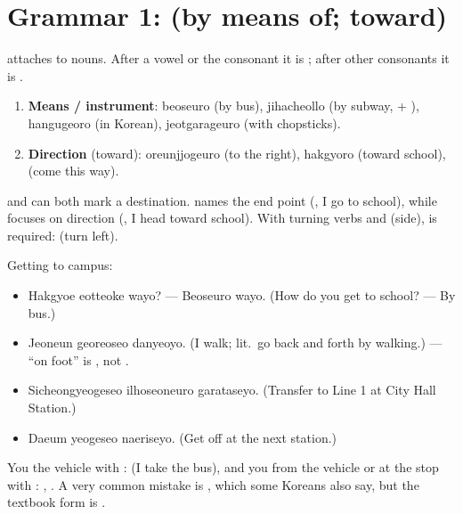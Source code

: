 \section{Grammar 1:  (by means of; toward)}

 attaches to nouns. After a vowel or the consonant  it is ;
after other consonants it is .

\begin{enumerate}
  \item \textbf{Means / instrument}:  beoseuro (by bus), 
        jihacheollo (by subway,  + ),  hangugeoro (in Korean),
         jeotgarageuro (with chopsticks).
  \item \textbf{Direction} (toward):  oreunjjogeuro (to the right),
         hakgyoro (toward school),  (come this way).
\end{enumerate}

\begin{remark}
 and  can both mark a destination.  names the end point
(, I go to school), while  focuses on direction (, I head toward school). With turning verbs and  (side),  is
required:  (turn left).
\end{remark}

\begin{example}
Getting to campus:
\begin{itemize}
  \item {} Hakgyoe eotteoke wayo? --- Beoseuro
        wayo. (How do you get to school? --- By bus.)
  \item {} Jeoneun georeoseo danyeoyo. (I walk; lit.\ go back and
        forth by walking.) --- ``on foot'' is , not .
  \item {} Sicheongyeogeseo ilhoseoneuro garataseyo.
        (Transfer to Line 1 at City Hall Station.)
  \item {} Daeum yeogeseo naeriseyo. (Get off at the next
        station.)
\end{itemize}
\end{example}

\begin{important}
You  the vehicle with :  (I take the bus), and you
 from the vehicle or at the stop with : ,
. A very common mistake is , which some Koreans
also say, but the textbook form is .
\end{important}

